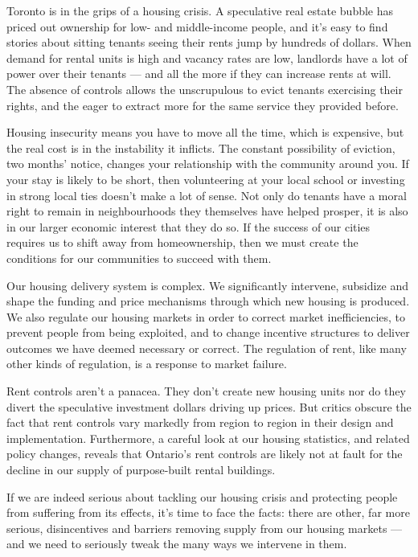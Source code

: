 Toronto is in the grips of a housing crisis. A speculative real estate bubble has priced out ownership for low- and middle-income people,\cite{cbc-squeeze} and it's easy to find stories about sitting tenants seeing their rents jump by hundreds of dollars.\cite{cbc-martin} \cite{tgam-jaafari} \cite{mercer-2017} When demand for rental units is high and vacancy rates are low, landlords have a lot of power over their tenants --- and all the more if they can increase rents at will. The absence of controls allows the unscrupulous to evict tenants exercising their rights, and the eager to extract more for the same service they provided before.

Housing insecurity means you have to move all the time, which is expensive, but the real cost is in the instability it inflicts. The constant possibility of eviction, two months' notice, changes your relationship with the community around you. If your stay is likely to be short, then volunteering at your local school or investing in strong local ties doesn't make a lot of sense.  Not only do tenants have a moral right to remain in neighbourhoods they themselves have helped prosper, it is also in our larger economic interest that they do so. If the success of our cities requires us to shift away from homeownership, then we must create the conditions for our communities to succeed with them.

Our housing delivery system is complex. We significantly intervene, subsidize and shape the funding and price mechanisms through which new housing is produced. We also regulate our housing markets in order to correct market inefficiencies, to prevent people from being exploited, and to change incentive structures to deliver outcomes we have deemed necessary or correct.  The regulation of rent, like many other kinds of regulation, is a response to market failure.

Rent controls aren't a panacea. They don't create new housing units nor do they divert the speculative investment dollars driving up prices. But critics obscure the fact that rent controls vary markedly from region to region in their design and implementation. Furthermore, a careful look at our housing statistics, and related policy changes, reveals that Ontario's rent controls are likely not at fault for the decline in our supply of purpose-built rental buildings.

If we are indeed serious about tackling our housing crisis and protecting people from suffering from its effects, it's time to face the facts: there are other, far more serious, disincentives and barriers removing supply from our housing markets --- and we need to seriously tweak the many ways we intervene in them.

